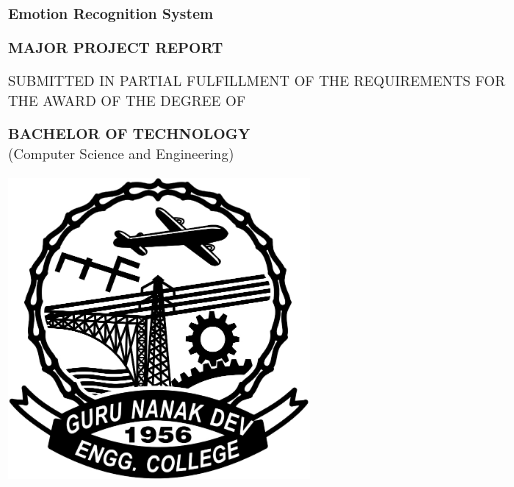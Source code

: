\begin{titlepage}
	\centering
	\fontsize{24}{0}\textbf{Emotion Recognition System}
	
	\vskip 0.75cm
	\fontsize{14}{0}\textbf{MAJOR PROJECT REPORT}
	
	\vskip 0.75cm
	\fontsize{12}{0}
	\textnormal{
	SUBMITTED IN PARTIAL FULFILLMENT OF THE REQUIREMENTS FOR THE AWARD OF THE DEGREE OF}

	\vskip 0.75cm
	\fontsize{14}{0}\textbf{BACHELOR OF TECHNOLOGY }\\
	\textnormal{(Computer Science and Engineering)}
	
	\vskip 2.25cm
	\includegraphics[width=8cm, height=8cm]{images/GNDEC_BLACK.png}
\end{titlepage}